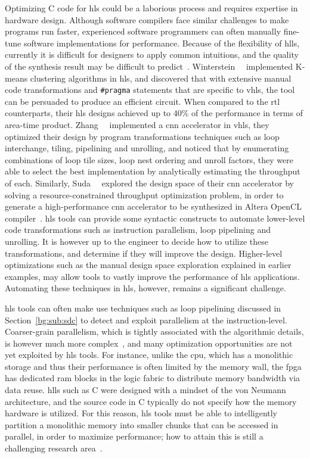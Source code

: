Optimizing C code for \gls{hls} could be a laborious process and requires
expertise in hardware design.  Although software compilers face similar
challenges to make programs run faster, experienced software programmers can
often manually fine-tune software implementations for performance.  Because
of the flexibility of \glspl{hll}, currently it is difficult for designers
to apply common intuitions, and the quality of the synthesis result may
be difficult to predict~\cite{gupta04}.  Winterstein~\etal~\cite{felix13}
implemented K-means clustering algorithms in \gls{hls}, and discovered that
with extensive manual code transformations and \verb|#pragma| statements that
are specific to \gls{vhls}, the tool can be persuaded to produce an efficient
circuit.  When compared to the \gls{rtl} counterparts, their \gls{hls}
designs achieved up to 40\% of the performance in terms of area-time product.
Zhang~\etal~\cite{zhang15} implemented a \gls{cnn} accelerator in \gls{vhls},
they optimized their design by program transformations techniques such as loop
interchange, tiling, pipelining and unrolling, and noticed that by enumerating
combinations of loop tile sizes, loop nest ordering and unroll factors,
they were able to select the best implementation by analytically estimating
the throughput of each.  Similarly, Suda~\etal~\cite{suda16} explored the
design space of their \gls{cnn} accelerator by solving a resource-constrained
throughput optimization problem, in order to generate a high-performance
\gls{cnn} accelerator to be synthesized in Altera OpenCL compiler~\cite{aoc}.
\Gls{hls} tools can provide some syntactic constructs to automate lower-level
code transformations such as instruction parallelism, loop pipelining and
unrolling.  It is however up to the engineer to decide how to utilize these
transformations, and determine if they will improve the design.  Higher-level
optimizations such as the manual design space exploration explained in earlier
examples, may allow tools to vastly improve the performance of \gls{hls}
applications.  Automating these techniques in \gls{hls}, however, remains a
significant challenge.

\Gls{hls} tools can often make use techniques such as loop pipelining
discussed in Section~\ref{bg:sub:sdc} to detect and exploit parallelism at the
instruction-level.  Coarser-grain parallelism, which is tightly associated
with the algorithmic details, is however much more complex~\cite{nane15}, and
many optimization opportunities are not yet exploited by \gls{hls} tools.  For
instance, unlike the \gls{cpu}, which has a monolithic storage and thus their
performance is often limited by the memory wall, the \gls{fpga} has dedicated
\gls{ram} blocks in the logic fabric to distribute memory bandwidth via data
reuse. \glspl{hll} such as C were designed with a mindset of the von Neumann
architecture, and the source code in C typically do not specify how the memory
hardware is utilized.  For this reason, \gls{hls} tools must be able to
intelligently partition a monolithic memory into smaller chunks that can be
accessed in parallel, in order to maximize performance; how to attain this is
still a challenging research area~\cite{cong11, cong12, wang13, felix15}.

